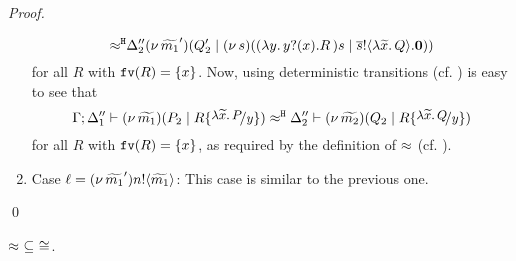 \begin{proof}
\begin{enumerate}[1.]
\[				{\approx^\mathtt{H}}
				{\Delta_2''}{}{(\nu\, \widetilde{m_1}')(Q_2' \;|\; (\nu\, s)((\lambda y.\,y ? (x) . R\, {)}{s}  \;|\; \overline{s} ! \langle \lambda \widetilde{x}.\,Q \rangle . \mathbf{0} ) )}
			\]
			for all $R$ with $\mathtt{fv}(R) = \{x\}$. Now, 
			using deterministic transitions (cf. ) is easy to see that
			\[
				\horel{\Gamma}{\Delta_1''}{\newsp{\widetilde{m_1}}{P_2 \Par  R \subst{\abs{\widetilde{x}}{P}}{y}}}{\hwb}{\Delta_2''}{\newsp{\widetilde{m_2}}{Q_2 \Par R \subst{\abs{\widetilde{x}}{Q}}{y}}}
			\]
			for all $R$ with $\mathtt{fv}(R) = \{x\}$, as required by the definition of $\approx$ (cf. ).\\
			

		\item	Case $\ell = (\nu\, \widetilde{m_1}') n ! \langle \widetilde{m_1} \rangle$: This case is similar to the previous one.
	\end{enumerate}
	\qed
\end{proof}



\begin{lemma}
	\label{app:lem:wbc_is_cong}
	$\approx\ \subseteq\ \cong$.
\end{lemma}



